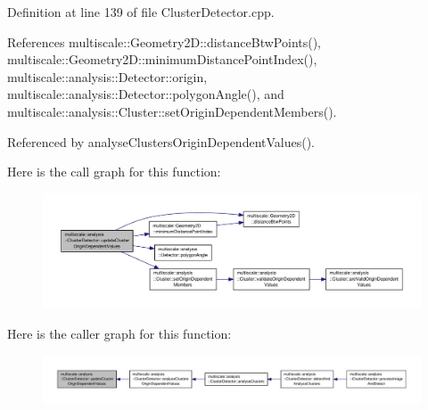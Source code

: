 Definition at line 139 of file Cluster\-Detector.\-cpp.



References multiscale\-::\-Geometry2\-D\-::distance\-Btw\-Points(), multiscale\-::\-Geometry2\-D\-::minimum\-Distance\-Point\-Index(), multiscale\-::analysis\-::\-Detector\-::origin, multiscale\-::analysis\-::\-Detector\-::polygon\-Angle(), and multiscale\-::analysis\-::\-Cluster\-::set\-Origin\-Dependent\-Members().



Referenced by analyse\-Clusters\-Origin\-Dependent\-Values().



Here is the call graph for this function\-:
\nopagebreak
\begin{figure}[H]
\begin{center}
\leavevmode
\includegraphics[width=350pt]{classmultiscale_1_1analysis_1_1ClusterDetector_ac7e008a7674205095f94b91c8d7cdccc_cgraph}
\end{center}
\end{figure}




Here is the caller graph for this function\-:
\nopagebreak
\begin{figure}[H]
\begin{center}
\leavevmode
\includegraphics[width=350pt]{classmultiscale_1_1analysis_1_1ClusterDetector_ac7e008a7674205095f94b91c8d7cdccc_icgraph}
\end{center}
\end{figure}




